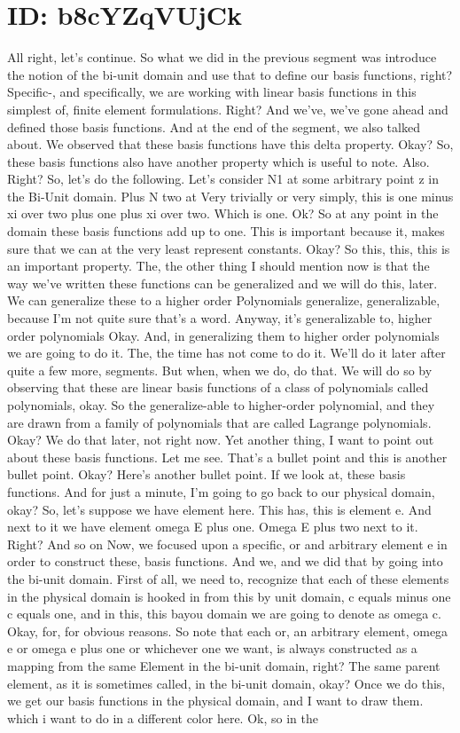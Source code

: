 \documentclass[10pt]{article}
\begin{document}
\section*{ID: b8cYZqVUjCk}
All right, let's continue. So what we did in the previous segment was introduce the notion of the bi-unit domain and use that to define our basis functions, right? Specific-, and specifically, we are working with linear basis functions in this simplest of, finite element formulations. Right? And we've, we've gone ahead and defined those basis functions. And at the end of the segment, we also talked about. We observed that these basis functions have this delta property. Okay? So, these basis functions also have another property which is useful to note. Also. Right? So, let's do the following. Let's consider N1 at some arbitrary point z in the Bi-Unit domain. Plus N two at Very trivially or very simply, this is one minus xi over two plus one plus xi over two. Which is one. Ok? So at any point in the domain these basis functions add up to one. This is important because it, makes sure that we can at the very least represent constants. Okay? So this, this, this is an important property. The, the other thing I should mention now is that the way we've written these functions can be generalized and we will do this, later. We can generalize these to a higher order Polynomials generalize, generalizable, because I'm not quite sure that's a word. Anyway, it's generalizable to, higher order polynomials Okay. And, in generalizing them to higher order polynomials we are going to do it. The, the time has not come to do it. We'll do it later after quite a few more, segments. But when, when we do, do that. We will do so by observing that these are linear basis functions of a class of polynomials called polynomials, okay. So the generalize-able to higher-order polynomial, and they are drawn from a family of polynomials that are called Lagrange polynomials. Okay? We do that later, not right now. Yet another thing, I want to point out about these basis functions. Let me see. That's a bullet point and this is another bullet point. Okay? Here's another bullet point. If we look at, these basis functions. And for just a minute, I'm going to go back to our physical domain, okay? So, let's suppose we have element here. This has, this is element e. And next to it we have element omega E plus one. Omega E plus two next to it. Right? And so on Now, we focused upon a specific, or and arbitrary element e in order to construct these, basis functions. And we, and we did that by going into the bi-unit domain. First of all, we need to, recognize that each of these elements in the physical domain is hooked in from this by unit domain, c equals minus one c equals one, and in this, this bayou domain we are going to denote as omega c. Okay, for, for obvious reasons. So note that each or, an arbitrary element, omega e or omega e plus one or whichever one we want, is always constructed as a mapping from the same Element in the bi-unit domain, right? The same parent element, as it is sometimes called, in the bi-unit domain, okay? Once we do this, we get our basis functions in the physical domain, and I want to draw them. which i want to do in a different color here. Ok, so in the 
\end{document}

